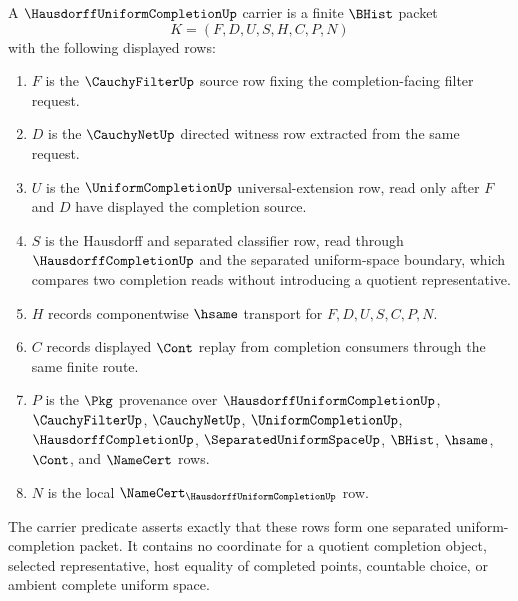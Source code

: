 \begin{definition}
\label{def:hausdorff-uniform-completion-carrier}
A $\HausdorffUniformCompletionUp$ carrier is a finite $\BHist$ packet
$$
K=(F,D,U,S,H,C,P,N)
$$
with the following displayed rows:
\begin{enumerate}
\item $F$ is the $\CauchyFilterUp$ source row fixing the completion-facing filter request.
\item $D$ is the $\CauchyNetUp$ directed witness row extracted from the same request.
\item $U$ is the $\UniformCompletionUp$ universal-extension row, read only after $F$ and $D$ have displayed the completion source.
\item $S$ is the Hausdorff and separated classifier row, read through $\HausdorffCompletionUp$ and the separated uniform-space boundary, which compares two completion reads without introducing a quotient representative.
\item $H$ records componentwise $\hsame$ transport for $F,D,U,S,C,P,N$.
\item $C$ records displayed $\Cont$ replay from completion consumers through the same finite route.
\item $P$ is the $\Pkg$ provenance over $\HausdorffUniformCompletionUp$, $\CauchyFilterUp$, $\CauchyNetUp$, $\UniformCompletionUp$, $\HausdorffCompletionUp$, $\SeparatedUniformSpaceUp$, $\BHist$, $\hsame$, $\Cont$, and $\NameCert$ rows.
\item $N$ is the local $\NameCert_{\HausdorffUniformCompletionUp}$ row.
\end{enumerate}
The carrier predicate asserts exactly that these rows form one separated uniform-completion packet. It contains no coordinate for a quotient completion object, selected representative, host equality of completed points, countable choice, or ambient complete uniform space.
\end{definition}

